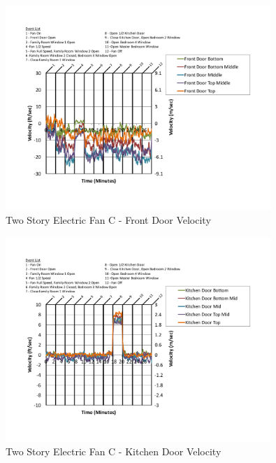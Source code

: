 \documentclass{article}
\begin{document}
\begin{appendices}
	\begin{figure}[H]
		\centering
		\includegraphics[height=3.05in,trim=0.67in 1.1in 0.67in 0.8in,clip=true]{0_Images/Results_Charts/ColdFlow/Two_Story/Electric/C/Front_Door_Velocity.pdf}
		\caption{Two Story Electric Fan C - Front Door Velocity}
	\end{figure}
 

	\begin{figure}[H]
		\centering
		\includegraphics[height=3.05in,trim=0.67in 1.1in 0.67in 0.8in,clip=true]{0_Images/Results_Charts/ColdFlow/Two_Story/Electric/C/Kitchen_Door_Velocity.pdf}
		\caption{Two Story Electric Fan C - Kitchen Door Velocity}
	\end{figure}
 
	\clearpage


\end{appendices}
\end{document}
